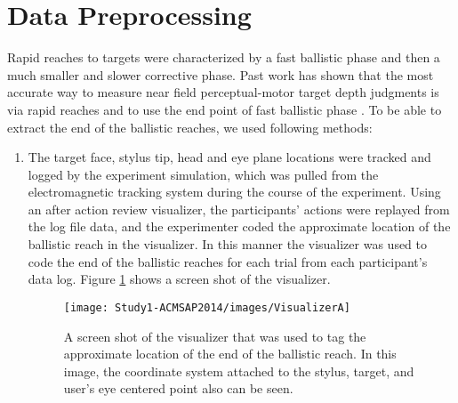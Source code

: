 \section{Data Preprocessing}\label{dataPreprocessing}

Rapid reaches to targets were characterized by a fast ballistic phase and then a much smaller and slower corrective phase. Past work has shown that the most accurate way to measure near field perceptual-motor target depth judgments is via rapid reaches and to use the end point of fast ballistic phase \cite{BP98,BR99,PB98,PGJ01,PI08}. To be able to extract the end of the ballistic reaches, we used following methods:

\begin{enumerate}
	\item The target face, stylus tip, head and eye plane locations were tracked and logged by the experiment simulation, which was pulled from the electromagnetic tracking system during the course of the experiment. Using an after action review visualizer, the participants' actions were replayed from the log file data, and the experimenter coded the approximate location of the ballistic reach in the visualizer. In this manner the visualizer was used to code the end of the ballistic reaches for each trial from each participant's data log. Figure \ref{fig:VisualizerA} shows a screen shot of the visualizer.
	\begin{figure}[ht]
		\centering
		\texttt{[image: Study1-ACMSAP2014/images/VisualizerA]}
		\caption{A screen shot of the visualizer that was used to tag the approximate location of the end of the ballistic reach. In this image, the coordinate system attached to the stylus, target, and user's eye centered point also can be seen.}
		\label{fig:VisualizerA}
	\end{figure}

\end{enumerate}
